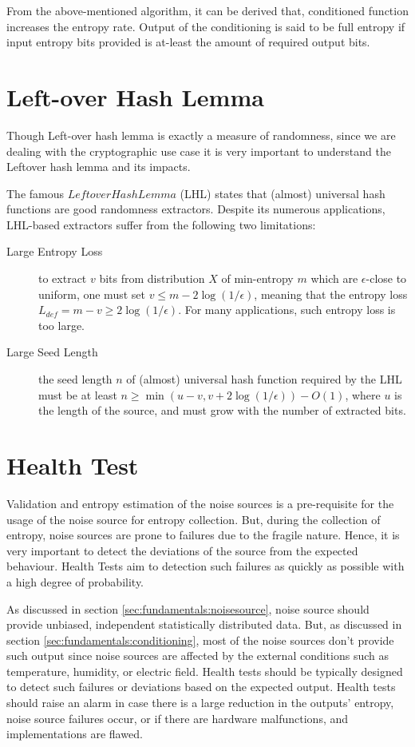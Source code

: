 From the above-mentioned algorithm, it can be derived that, conditioned function increases the entropy rate. Output of the conditioning is said to be full entropy if input entropy bits provided is at-least the amount of required output bits. 

%
%
\section{Left-over Hash Lemma}
\label{sec:fundamentals:LHL}
Though Left-over hash lemma is exactly a measure of randomness, since we are dealing with the cryptographic use case it is very important to understand the Leftover hash lemma and its impacts.

The famous $Leftover Hash Lemma$ (LHL) states that (almost) universal hash functions are good randomness extractors. Despite its numerous applications, LHL-based extractors suffer from the following two limitations:
\begin{description}
	\item[Large Entropy Loss] to extract $v$ bits from distribution $X$ of min-entropy $m$ which are $\epsilon$-close to uniform, one must set $v\le m{-}2\log(1/\epsilon)$, meaning that the entropy loss $L_{def}=m{-}v\ge2\log(1/\epsilon)$. For many applications, such entropy loss is too large. 
	\item[Large Seed Length] the seed length $n$ of (almost) universal hash function required by the LHL must be at least $n\ge \min(u{-}v,v+2\log(1/\epsilon)){-}O(1)$, where $u$ is the length of the source, and must grow with the number of extracted bits.
\end{description}

%
%
\section{Health Test}
\label{sec:fundamentals:HT}
Validation and entropy estimation of the noise sources is a pre-requisite for the usage of the noise source for entropy collection. But, during the collection of entropy, noise sources are prone to failures due to the fragile nature. Hence, it is very important to detect the deviations of the source from the expected behaviour. Health Tests aim to detection such failures as quickly as possible with a high degree of probability.

As discussed in section \ref{sec:fundamentals:noisesource}, noise source should provide unbiased, independent statistically distributed data. But, as discussed in section \ref{sec:fundamentals:conditioning}, most of the noise sources don’t provide such output since noise sources are affected by the external conditions such as temperature, humidity, or electric field. Health tests should be typically designed to detect such failures or deviations based on the expected output. Health tests should raise an alarm in case there is a large reduction in the outputs' entropy, noise source failures occur, or if there are hardware malfunctions, and implementations are flawed.

